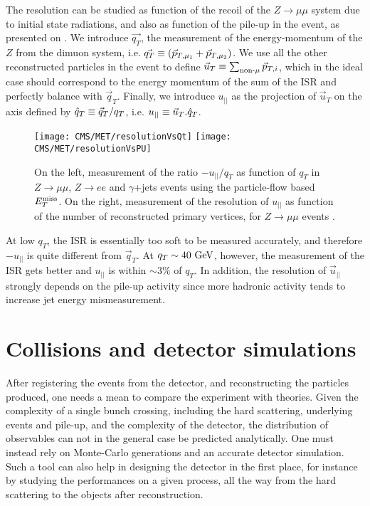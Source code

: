     The resolution can be studied as function of the recoil of the $Z \rightarrow \mu\mu$
    system due to initial state radiations, and also as function of the pile-up in the
    event, as presented on . We introduce $\vec{q_T}$,
    the measurement of the energy-momentum of the $Z$ from the dimuon system, i.e.
    $\vec{q_T} \equiv (\vec{p}_{T,\mu_1} + \vec{p}_{T,\mu_2})$. We use all the other
    reconstructed particles in the event to define $\vec{u}_T \equiv \sum_{\text{non-}\mu} \vec{p}_{T,i}$,
    which in the ideal case should correspond to the energy momentum of the sum of the
    ISR and perfectly balance with $\vec{q}_T$. Finally, we introduce $u_{||}$ as the
    projection of $\vec{u}_T$ on the axis defined by $\hat{q}_T \equiv \vec{q}_T
    / q_T$, i.e. $u_{||} \equiv \vec{u}_T . \hat{q}_T$.

    \begin{figure}[h!]
        \centering
        \texttt{[image: CMS/MET/resolutionVsQt]}
        \texttt{[image: CMS/MET/resolutionVsPU]}
        \caption{On the left, measurement of the ratio $-u_{||}/q_T$ as function of $q_T$
        in $Z\rightarrow\mu\mu$, $Z\rightarrow e e$ and $\gamma$+jets events using
        the particle-flow based $E_T^\text{miss}$. On the right, measurement of the resolution of
        $u_{||}$ as function of the number of reconstructed primary vertices, for
        $Z\rightarrow\mu\mu$ events \cite{METperf}.}
        \label{fig:METresolution}
    \end{figure}

    At low $q_T$, the ISR is essentially too soft to be measured accurately, and
    therefore $- u_{||}$ is quite different from $\vec{q}_T$. At $q_T \sim 40~\text{GeV}$,
    however, the measurement of the ISR gets better and $u_{||}$ is within $\sim 3\%$
    of $q_T$. In addition, the resolution of $\vec{u}_{||}$ strongly depends on the
    pile-up activity since more hadronic activity tends to increase jet energy
    mismeasurement.

    \section{Collisions and detector simulations \label{sec:simu}}

    After registering the events from the detector, and reconstructing the particles
    produced, one needs a mean to compare the experiment with theories. Given
    the complexity of a single bunch crossing, including the hard scattering,
    underlying events and pile-up, and the complexity of the detector, the distribution
    of observables can not in the general case be predicted analytically. One must
    instead rely on Monte-Carlo generations and an accurate detector simulation.
    Such a tool can also help in designing the detector in the first place, for
    instance by studying the performances on a given process, all the way
    from the hard scattering to the objects after reconstruction.

